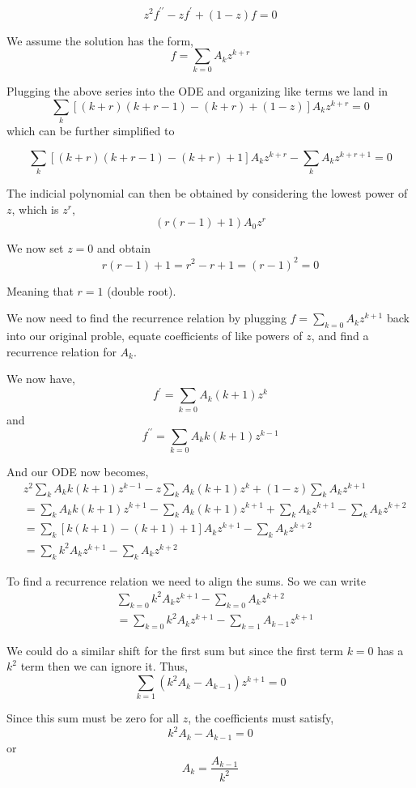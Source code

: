 $$
z^2 f^{\prime\prime} - zf^\prime + (1-z)f = 0
$$

We assume the solution has the form,
$$
f = \sum_{k=0} A_k z^{k+r}
$$

Plugging the above series into the ODE and organizing like terms we land in
$$
\sum_k \left[ (k+r)(k+r-1) - (k+r) + (1-z) \right] A_k z^{k+r} = 0
$$
which can be further simplified to

$$
\sum_k \left[ (k+r)(k+r-1) - (k+r) + 1 \right] A_k z^{k+r}
    - \sum_k A_k z^{k+r+1} 
= 0
$$

The indicial polynomial can then be obtained by considering the lowest power of $z$, which is $z^r$,
$$
(r(r-1) + 1) A_0 z^r
$$

We now set $z=0$ and obtain
$$
r(r-1) + 1 = r^2 -r + 1 = (r-1)^2 = 0
$$

Meaning that $r=1$ (double root).

We now need to find the recurrence relation by plugging $f = \sum_{k=0} A_k z^{k+1}$ back into our original proble,
equate coefficients of like powers of $z$, and find a recurrence relation for $A_k$.

We now have,
$$
f^\prime = \sum_{k=0} A_k (k+1) z^k
$$
and
$$
f^{\prime\prime} = \sum_{k=0} A_k k(k+1) z^{k-1}
$$

And our ODE now becomes,
\begin{align*}
& z^2 \sum_{k} A_k k(k+1) z^{k-1}
    - z \sum_{k} A_k (k+1) z^k
    + (1-z) \sum_{k} A_k z^{k+1} \\
&= \sum_{k} A_k k(k+1) z^{k+1}
    - \sum_{k} A_k (k+1) z^{k+1}
    + \sum_{k} A_k z^{k+1}
    - \sum_{k} A_k z^{k+2} \\
&= \sum_k \left[ k(k+1) - (k+1) + 1 \right] A_k z^{k+1} - \sum_{k} A_k z^{k+2} \\
&= \sum_k k^2 A_k z^{k+1} - \sum_{k} A_k z^{k+2}
\end{align*}

To find a recurrence relation we need to align the sums.
So we can write
\begin{align*}
& \sum_{k=0} k^2 A_k z^{k+1} - \sum_{k=0} A_k z^{k+2} \\
&= \sum_{k=0} k^2 A_k z^{k+1} - \sum_{k=1} A_{k-1} z^{k+1}
\end{align*}

We could do a similar shift for the first sum but since the first term $k=0$ has a $k^2$ term then we can ignore it.
Thus,
$$
\sum_{k=1} \left( k^2 A_k - A_{k-1} \right) z^{k+1} = 0
$$

Since this sum must be zero for all $z$, the coefficients must satisfy,
$$
k^2 A_k - A_{k-1} = 0
$$
or
$$
A_k = \frac{ A_{k-1} }{k^2} 
$$


